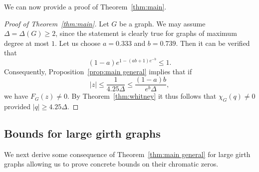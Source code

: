 \documentclass[a4paper,11pt,reqno]{amsart}
\numberwithin{equation}{section}
\begin{document}
We can now provide a proof of Theorem~\ref{thm:main}.
\begin{proof}[Proof of Theorem~\ref{thm:main}]
Let $G$ be a graph. 
We may assume $\Delta=\Delta(G)\geq 2$, since the statement is clearly true for graphs of maximum degree at most $1$. %
Let us choose $a=0.333$ and $b=0.739$. Then it can be verified that 
\[
(1-a)e^{1-(ab+1)e^{-b}}\leq 1.
\]
Consequently, Proposition~\ref{prop:main general} implies that if 
\[
|z|\leq \frac{1}{4.25\Delta}\leq \frac{(1-a)b}{e^b\Delta},
\]
we have $F_G(z)\neq 0$.
By Theorem~\ref{thm:whitney} it thus follows that $\chi_G(q)\neq 0$ provided $|q|\ge 4.25\Delta$.
\end{proof}
\subsection{Bounds for large girth graphs}
We next derive some consequence of Theorem~\ref{thm:main general} for large girth graphs allowing us to prove concrete bounds on their chromatic zeros.
\end{document}
